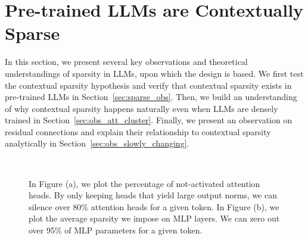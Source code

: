 
\section{Pre-trained LLMs are Contextually Sparse} \label{sec:obs}
In this section, we present several key observations and theoretical understandings of sparsity in LLMs, upon which the \name{} design is based.
We first test the contextual sparsity hypothesis and verify that contextual sparsity exists in pre-trained LLMs in Section~\ref{sec:sparse_obs}. Then, we build an understanding of why contextual sparsity happens naturally even when LLMs are densely trained in Section~\ref{sec:obs_att_cluster}. Finally, we present an observation on residual connections and explain their relationship to contextual sparsity analytically in Section~\ref{sec:obs_slowly_changing}.

\begin{figure}[t]
  \centering
    \\
  \vspace{-2mm}
    \vspace{-2mm}
  \caption{ In Figure (a), we plot the percentage of not-activated attention heads. By only keeping heads that yield large output norms, we can silence over 80\% attention heads for a given token. In Figure (b), we plot the average sparsity we impose on MLP layers. We can zero out over 95\% of MLP parameters for a given token.}
    \vspace{-4mm}
  \label{observation:sparsity} 
\end{figure}

